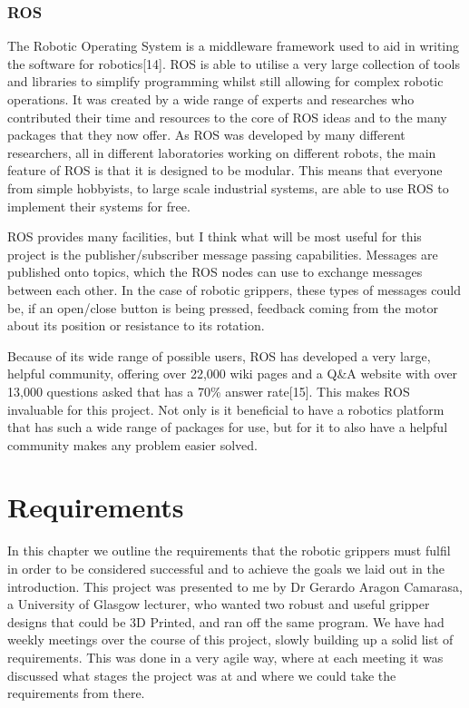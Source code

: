 \documentclass{l4proj}
\begin{document}
\subsection{ROS}
The Robotic Operating System is a middleware framework used to aid in writing the software for robotics[14]. ROS is able to utilise a very large collection of tools and libraries to simplify programming whilst still allowing for complex robotic operations. It was created by a wide range of experts and researches who contributed their time and resources to the core of ROS ideas and to the many packages that they now offer. As ROS was developed by many different researchers, all in different laboratories working on different robots, the main feature of ROS is that it is designed to be modular. This means that everyone from simple hobbyists, to large scale industrial systems, are able to use ROS to implement their systems for free. 

ROS provides many facilities, but I think what will be most useful for this project is the publisher/subscriber message passing capabilities. Messages are published onto topics, which the ROS nodes can use to exchange messages between each other. In the case of robotic grippers, these types of messages could be, if an open/close button is being pressed, feedback coming from the motor about its position or resistance to its rotation.

Because of its wide range of possible users, ROS has developed a very large, helpful community, offering over 22,000 wiki pages and a Q\&A website with over 13,000 questions asked that has a 70\% answer rate[15]. This makes ROS invaluable for this project. Not only is it beneficial to have a robotics platform that has such a wide range of packages for use, but for it to also have a helpful community makes any problem easier solved.




\chapter{Requirements}
In this chapter we outline the requirements that the robotic grippers must fulfil in order to be considered successful and to achieve the goals we laid out in the introduction. This project was presented to me by Dr Gerardo Aragon Camarasa, a University of Glasgow lecturer, who wanted two robust and useful gripper designs that could be 3D Printed, and ran off the same program. We have had weekly meetings over the course of this project, slowly building up a solid list of requirements. This was done in a very agile way, where at each meeting it was discussed what stages the project was at and where we could take the requirements from there. 
\end{document}
